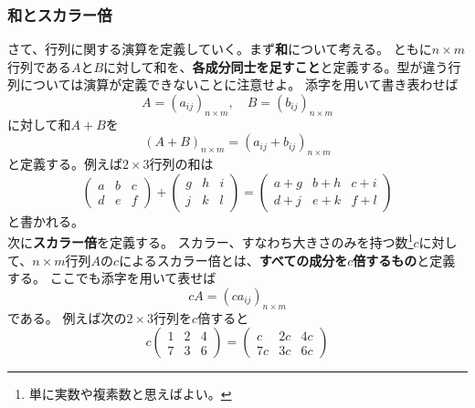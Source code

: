 \documentclass[10pt]{jsarticle}
\theoremstyle{definition}%
\numberwithin{equation}{section}%
\begin{document}
\subsubsection{和とスカラー倍}
さて、行列に関する演算を定義していく。まず{\bf 和}について考える。
ともに$n\times m$行列である$A$と$B$に対して和を、{\bf 各成分同士を足すこと}と定義する。型が違う行列については演算が定義できないことに注意せよ。
添字を用いて書き表わせば
\begin{equation}
  A=(a_{ij})_{n\times m},\quad B=(b_{ij})_{n\times m}
\end{equation}
に対して和$A+B$を
\begin{equation}
  (A+B)_{n\times m}=(a_{ij}+b_{ij})_{n\times m}
\end{equation}
と定義する。例えば$2\times 3$行列の和は
\begin{equation}
  \left( 
    \begin{matrix}
      a & b & c \\
      d & e & f
    \end{matrix}
  \right)
+
\left( 
  \begin{matrix}
    g & h & i \\
    j & k & l
  \end{matrix}
\right)=\left( 
  \begin{matrix}
    a+g & b+h & c+i \\
    d+j & e+k & f+l
  \end{matrix}
\right)
\end{equation}
と書かれる。\\
次に{\bf スカラー倍}を定義する。
スカラー、すなわち大きさのみを持つ数\footnote{単に実数や複素数と思えばよい。}$c$に対して、$n\times m$行列$A$の$c$によるスカラー倍とは、{\bf すべての成分を$c$倍するもの}と定義する。
ここでも添字を用いて表せば
\begin{equation}
  cA = (ca_{ij})_{n\times m}
\end{equation}
である。
例えば次の$2\times 3$行列を$c$倍すると
\begin{equation}
  c \left( 
       \begin{matrix}
        1 & 2 & 4 \\
        7 & 3 & 6
      \end{matrix}
    \right)
    =
    \left( 
      \begin{matrix}
        c & 2c & 4c \\
        7c & 3c & 6c
      \end{matrix}
    \right)
\end{equation}
\end{document}
